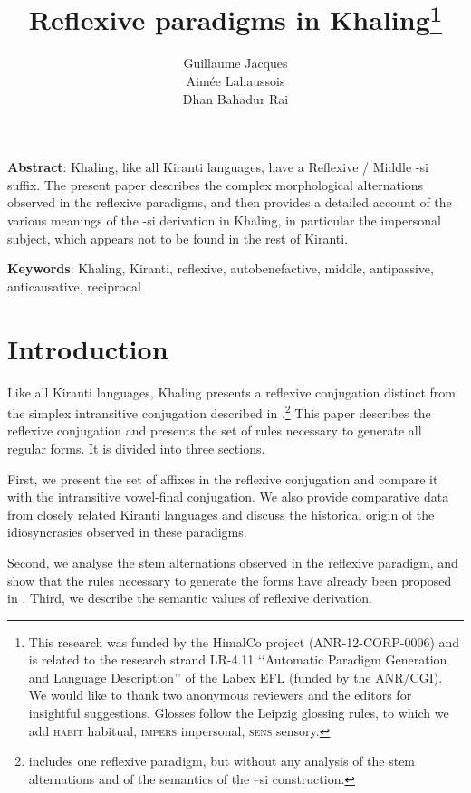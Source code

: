 \documentclass[twoside,a4paper,11pt]{article}
\newcommand{\ipa}[1]{{\phon#1}}
\begin{document}
\title{Reflexive paradigms in Khaling\footnote{This research was funded by the HimalCo project (ANR-12-CORP-0006) and is related to the research strand LR-4.11 ‘‘Automatic Paradigm Generation and Language Description’’ of the Labex EFL (funded by the ANR/CGI). We would like to thank two anonymous reviewers and the editors for insightful suggestions. Glosses follow the Leipzig glossing rules, to which we add \textsc{habit} habitual, \textsc{impers} impersonal, \textsc{sens} sensory.} } 

\author{Guillaume Jacques\\Aimée Lahaussois\\Dhan Bahadur Rai}

\maketitle

\linenumbers
\textbf{Abstract}: Khaling, like all Kiranti languages, have a Reflexive / Middle -si suffix. The present paper describes the complex morphological alternations observed in the reflexive paradigms, and then provides a detailed account of the various meanings of the -si derivation in Khaling, in particular the impersonal subject, which appears not to be found in the rest of  Kiranti.


\textbf{Keywords}: Khaling, Kiranti, reflexive,  autobenefactive, middle, antipassive, anticausative, reciprocal


 \section{Introduction}
Like all Kiranti languages, Khaling presents a reflexive conjugation distinct from the simplex intransitive conjugation   described in \citet{jacques12khaling}.\footnote{\citet{toba84khaling} includes one reflexive paradigm, but without any analysis of the stem alternations and of the semantics of the \ipa{--si} construction.}  This paper describes the reflexive conjugation and presents the set of rules necessary to generate all regular forms. It is divided into three sections. 

First, we present the set of affixes in the reflexive conjugation and compare it with the intransitive vowel-final  conjugation. We also provide comparative data from  closely related Kiranti languages and discuss the historical origin of the idiosyncrasies observed in these paradigms.

Second, we analyse the stem alternations observed in the reflexive paradigm, and show that the rules necessary to generate the forms have already been proposed in  \citet{jacques12khaling}. Third, we describe the semantic values of   reflexive derivation.
\end{document}
